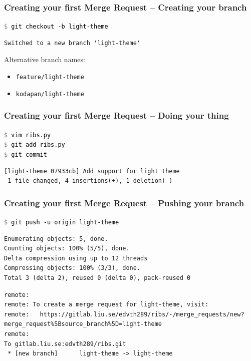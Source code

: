 \documentclass{beamer}
\newcommand{\command}[1]{\colorbox{black!90!white!10!}{\vphantom{Ep}\texttt{\textcolor{gray}{\$} \textcolor{black}{#1}}}}
\begin{document}
\begin{frame}[fragile]
  \frametitle{Creating your first Merge Request -- Creating your branch}
  \command{git checkout -b light-theme}
\begin{verbatim}
Switched to a new branch 'light-theme'
\end{verbatim}

\pause{}

Alternative branch names:
\begin{itemize}
  \item \texttt{feature/light-theme}
  \item \texttt{kodapan/light-theme}
\end{itemize}
\end{frame}

\begin{frame}[fragile]
  \frametitle{Creating your first Merge Request -- Doing your thing}
  \command{vim ribs.py}\\
  \command{git add ribs.py}\\
  \command{git commit}
\begin{verbatim}
[light-theme 07933cb] Add support for light theme
 1 file changed, 4 insertions(+), 1 deletion(-)
\end{verbatim}
\end{frame}

\begin{frame}[fragile]
  \frametitle{Creating your first Merge Request -- Pushing your branch}
  \command{git push -u origin light-theme}
\pause
\vspace{-0.6ex}
{
\color{gray}
\begin{Verbatim}[commandchars=\\\{\}]
Enumerating objects: 5, done.
Counting objects: 100% (5/5), done.
Delta compression using up to 12 threads
Compressing objects: 100% (3/3), done.
Total 3 (delta 2), reused 0 (delta 0), pack-reused 0
\end{Verbatim}
}
\vspace{-1.2ex}
\begin{Verbatim}[commandchars=\\\{\}]
remote:
remote: To create a merge request for light-theme, visit:
remote:   https://gitlab.liu.se/edvth289/ribs/-/merge_requests/new?merge_request%5Bsource_branch%5D=light-theme
remote:
To gitlab.liu.se:edvth289/ribs.git
 * [new branch]      light-theme -> light-theme
\end{Verbatim}
\end{frame}
\end{document}
